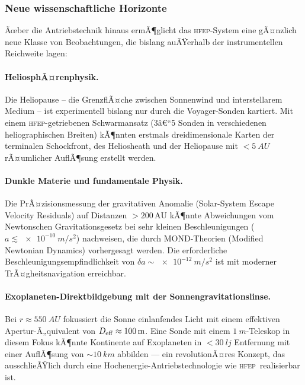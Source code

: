 ﻿\documentclass[a4paper,12pt,twoside]{article}
\theoremstyle{plain}
\theoremstyle{definition}
\theoremstyle{remark}
\newcommand{\HFEP}{\textsc{hfep}}
\begin{document}
	\subsubsection{Neue wissenschaftliche Horizonte}

	Ãœber die Antriebstechnik hinaus ermÃ¶glicht das \HFEP-System eine gÃ¤nzlich
	neue Klasse von Beobachtungen, die bislang auÃŸerhalb der instrumentellen
	Reichweite lagen:

	\paragraph{HeliosphÃ¤renphysik.}
	Die Heliopause -- die GrenzflÃ¤che zwischen Sonnenwind und interstellarem
	Medium -- ist experimentell bislang nur durch die Voyager-Sonden kartiert.
	Mit einem \HFEP-getriebenen Schwarmansatz (3â€“5 Sonden in verschiedenen
	heliographischen Breiten) kÃ¶nnten erstmals dreidimensionale Karten der
	terminalen Schockfront, des Heliosheath und der Heliopause mit
	$<\SI{5}{AU}$ rÃ¤umlicher AuflÃ¶sung erstellt werden.

	\paragraph{Dunkle Materie und fundamentale Physik.}
	Die PrÃ¤zisionsmessung der gravitativen Anomalie (Solar-System Escape
	Velocity Residuals) auf Distanzen $>200\,\mathrm{AU}$ kÃ¶nnte Abweichungen
	vom Newtonschen Gravitationsgesetz bei sehr kleinen Beschleunigungen
	($a \lesssim \SI{e-10}{m/s^2}$) nachweisen, die durch MOND-Theorien
	(Modified Newtonian Dynamics) vorhergesagt werden. Die erforderliche
	Beschleunigungsempfindlichkeit von $\delta a \sim\SI{e-12}{m/s^2}$ ist mit
	moderner TrÃ¤gheitsnavigation erreichbar.

	\paragraph{Exoplaneten-Direktbildgebung mit der Sonnengravitationslinse.}
	Bei $r \approx \SI{550}{AU}$ fokussiert die Sonne einlanfendes
	Licht mit einem effektiven Apertur-Ã„quivalent von
	$D_{\rm eff} \approx \SI{100}{m}$. Eine Sonde mit einem
	$\SI{1}{m}$-Teleskop in diesem Fokus kÃ¶nnte Kontinente auf Exoplaneten
	in $<\SI{30}{lj}$ Entfernung mit einer AuflÃ¶sung von $\sim\SI{10}{km}$
	abbilden --- ein revolutionÃ¤res Konzept, das ausschlieÃŸlich durch
	eine Hochenergie-Antriebstechnologie wie \HFEP\ realisierbar ist.
\end{document}
